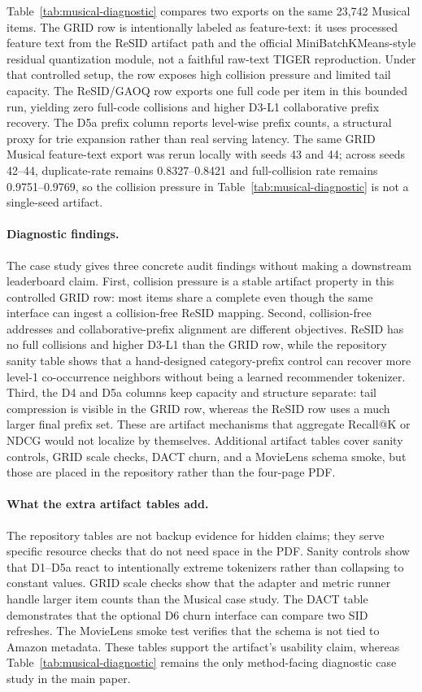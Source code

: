Table~\ref{tab:musical-diagnostic} compares two exports on the same 23,742
Musical items. The GRID row is intentionally labeled as feature-text: it uses
processed feature text from the ReSID artifact path and the official
MiniBatchKMeans-style residual quantization module, not a faithful raw-text
TIGER reproduction. Under that controlled setup, the row exposes high collision
pressure and limited tail capacity. The ReSID/GAOQ row exports one full code
per item in this bounded run, yielding zero full-code collisions and higher
D3-L1 collaborative prefix recovery. The D5a prefix column reports level-wise
prefix counts, a structural proxy for trie expansion rather than real serving
latency.
The same GRID Musical feature-text export was rerun locally with seeds 43 and
44; across seeds 42--44, duplicate-\sid rate remains 0.8327--0.8421 and
full-collision rate remains 0.9751--0.9769, so the collision pressure in
Table~\ref{tab:musical-diagnostic} is not a single-seed artifact.

\paragraph{Diagnostic findings.}
The case study gives three concrete audit findings without making a downstream
leaderboard claim. First, collision pressure is a stable artifact property in
this controlled GRID row: most items share a complete \sid{} even though the
same interface can ingest a collision-free ReSID mapping. Second,
collision-free addresses and collaborative-prefix alignment are different
objectives. ReSID has no full collisions and higher D3-L1 than the GRID row,
while the repository sanity table shows that a hand-designed category-prefix
control can recover more level-1 co-occurrence neighbors without being a
learned recommender tokenizer. Third, the D4 and D5a columns keep capacity and
structure separate: tail compression is visible in the GRID row, whereas the
ReSID row uses a much larger final prefix set. These are artifact mechanisms
that aggregate Recall@K or NDCG would not localize by themselves. Additional
artifact tables cover sanity controls, GRID scale checks, DACT churn, and a
MovieLens schema smoke, but those are placed in the repository rather than the
four-page PDF.

\paragraph{What the extra artifact tables add.}
The repository tables are not backup evidence for hidden claims; they serve
specific resource checks that do not need space in the PDF. Sanity controls
show that D1--D5a react to intentionally extreme tokenizers rather than
collapsing to constant values. GRID scale checks show that the adapter and
metric runner handle larger item counts than the Musical case study. The DACT
table demonstrates that the optional D6 churn interface can compare two SID
refreshes. The MovieLens smoke test verifies that the schema is not tied to
Amazon metadata. These tables support the artifact's usability claim, whereas
Table~\ref{tab:musical-diagnostic} remains the only method-facing diagnostic
case study in the main paper.
